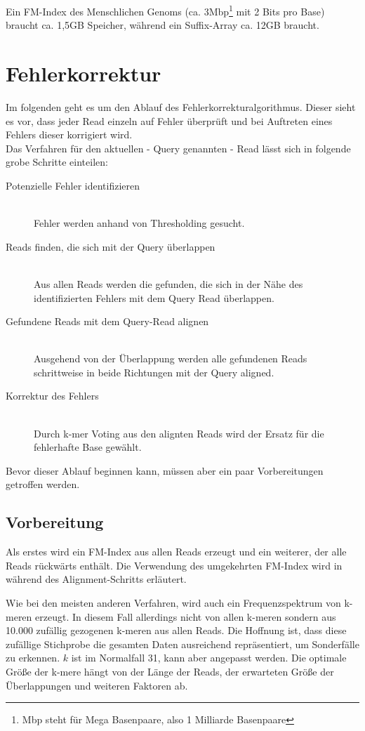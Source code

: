 Ein FM-Index des Menschlichen Genoms (ca. 3Mbp\footnote{Mbp steht für Mega Basenpaare, also 1 Milliarde Basenpaare} mit 2 Bits pro Base) braucht ca. 1,5GB Speicher, während ein Suffix-Array ca. 12GB braucht.

\section{Fehlerkorrektur}
\label{sec:methodik-fehlerkorrektur}

Im folgenden geht es um den Ablauf des Fehlerkorrekturalgorithmus.
Dieser sieht es vor, dass jeder Read einzeln auf Fehler überprüft und bei Auftreten eines Fehlers dieser korrigiert wird.\\
Das Verfahren für den aktuellen - Query genannten - Read lässt sich in folgende grobe Schritte einteilen:

\begin{description}
	\item[Potenzielle Fehler identifizieren]\hfill\\
		Fehler werden anhand von Thresholding gesucht.
	\item[Reads finden, die sich mit der Query überlappen]\hfill\\
		Aus allen Reads werden die gefunden, die sich in der Nähe des identifizierten Fehlers mit dem Query Read überlappen.
	\item[Gefundene Reads mit dem Query-Read alignen]\hfill\\
		Ausgehend von der Überlappung werden alle gefundenen Reads schrittweise in beide Richtungen mit der Query aligned.
	\item[Korrektur des Fehlers]\hfill\\
		Durch k-mer Voting aus den alignten Reads wird der Ersatz für die fehlerhafte Base gewählt.
\end{description}

Bevor dieser Ablauf beginnen kann, müssen aber ein paar Vorbereitungen getroffen werden.


\subsection{Vorbereitung}
\label{subsec:vorbereitung}

Als erstes wird ein FM-Index aus allen Reads erzeugt und ein weiterer, der alle Reads rückwärts enthält.
Die Verwendung des umgekehrten FM-Index wird in während des Alignment-Schritts erläutert.

Wie bei den meisten anderen Verfahren, wird auch ein Frequenzspektrum von k-meren erzeugt.
In diesem Fall allerdings nicht von allen k-meren sondern aus 10.000 zufällig gezogenen k-meren aus allen Reads.
Die Hoffnung ist, dass diese zufällige Stichprobe die gesamten Daten ausreichend repräsentiert, um Sonderfälle zu erkennen.
$k$ ist im Normalfall 31, kann aber angepasst werden.
Die optimale Größe der k-mere hängt von der Länge der Reads, der erwarteten Größe der Überlappungen und weiteren Faktoren ab.

